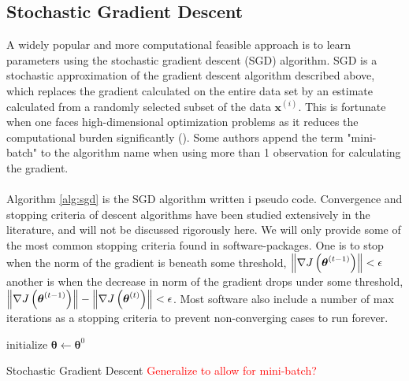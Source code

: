 \subsection{Stochastic Gradient Descent} \label{sec:sgd}
A widely popular and more computational feasible approach is to learn parameters using the stochastic gradient descent (SGD) algorithm. SGD is a stochastic approximation of the gradient descent algorithm described above, which replaces the gradient calculated on the entire data set by an estimate calculated from a randomly selected subset of the data $\boldsymbol{x}^{(i)}$. This is fortunate when one faces high-dimensional optimization problems as it reduces the computational burden significantly (\cite{bottou2008tradeoffs}). Some authors append the term "mini-batch" to the algorithm name when using more than 1 observation for calculating the gradient.\\
\\
Algorithm \ref{alg:sgd} is the SGD algorithm written i pseudo code. Convergence and stopping criteria of descent algorithms have been studied extensively in the literature, and will not be discussed rigorously here. We will only provide some of the  most common stopping criteria found in software-packages. One is to stop when the norm of the gradient is beneath some threshold, $\left\lVert\nabla J \left (\boldsymbol{\theta}^{(t-1)}\right)\right\rVert < \epsilon$ another is when the decrease in norm of the gradient drops under some threshold, $\left\lVert\nabla J \left (\boldsymbol{\theta}^{(t -1 )}\right)\right\rVert - \left\lVert \nabla J \left (\boldsymbol{\theta}^{(t)}\right)\right\rVert < \epsilon$. Most software also include a number of max iterations as a stopping criteria to prevent non-converging cases to run forever.\\
\begin{algorithm}[H]\label{alg:sgd}
    \SetAlgoLined
    initialize $\boldsymbol{\theta}\leftarrow \boldsymbol{\theta}^0$ \\
     \caption{Stochastic Gradient Descent \textcolor{red}{Generalize to allow for mini-batch?}}
\end{algorithm}

